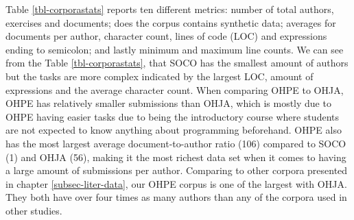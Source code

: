 \begin{table}[ht]
\centering
\caption{Descriptive statistics for the unprocessed corpora. SOCO has been divided into three related corpora: train (T), test scenario without plagiarism (C1) and test scenario with plagiarism (C2). Bold values represents maximum value per metric.}
\label{tbl-corporastats}
\end{table}

\noindent
 Table \ref{tbl-corporastats} reports ten different metrics: number of total authors, exercises and documents; does the corpus contains synthetic data; averages for documents per author, character count, lines of code (LOC) and expressions ending to semicolon; and lastly minimum and maximum line counts. We can see from the Table \ref{tbl-corporastats}, that SOCO has the smallest amount of authors but the tasks are more complex indicated by the largest LOC, amount of expressions and the average character count. When comparing OHPE to OHJA, OHPE has relatively smaller submissions than OHJA, which is mostly due to OHPE having easier tasks due to being the introductory course where students are not expected to know anything about programming beforehand. OHPE also has the most largest average document-to-author ratio (106) compared to SOCO (1) and OHJA (56), making it the most richest data set when it comes to having a large amount of submissions per author.  Comparing to other corpora presented in chapter \ref{subsec-liter-data}, our OHPE corpus is one of the largest with OHJA. They both have over four times as many authors than any of the corpora used in other studies.

